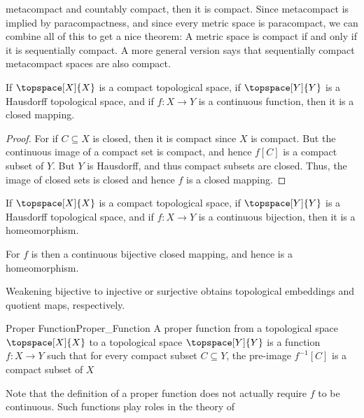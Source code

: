 \documentclass{article}                                                        %
\begin{document}
        metacompact and countably compact, then it is compact. Since metacompact
        is implied by paracompactness, and since every metric space is
        paracompact, we can combine all of this to get a nice theorem: A metric
        space is compact if and only if it is sequentially compact. A more
        general version says that sequentially compact metacompact spaces are
        also compact.
        \begin{theorem}
            If $\topspace[X]{X}$ is a compact topological space, if
            $\topspace[Y]{Y}$ is a Hausdorff topological space, and if
            $f:X\rightarrow{Y}$ is a continuous function, then it is a closed
            mapping.
        \end{theorem}
        \begin{proof}
            For if $C\subseteq{X}$ is closed, then it is compact since $X$ is
            compact. But the continuous image of a compact set is compact, and
            hence $f[C]$ is a compact subset of $Y$. But $Y$ is Hausdorff, and
            thus compact subsets are closed. Thus, the image of closed sets is
            closed and hence $f$ is a closed mapping.
        \end{proof}
        \begin{theorem}
            If $\topspace[X]{X}$ is a compact topological space, if
            $\topspace[Y]{Y}$ is a Hausdorff topological space, and if
            $f:X\rightarrow{Y}$ is a continuous bijection, then it is a
            homeomorphism.
        \end{theorem}
        \begin{theorem}
            For $f$ is then a continuous bijective closed mapping, and hence
            is a homeomorphism.
        \end{theorem}
        Weakening bijective to injective or surjective obtains topological
        embeddings and quotient maps, respectively.
        \begin{fdefinition}{Proper Function}{Proper_Function}
            A proper function from a topological space $\topspace[X]{X}$ to a
            topological space $\topspace[Y]{Y}$ is a function
            $f:X\rightarrow{Y}$ such that for every compact subset
            $C\subseteq{Y}$, the pre-image $f^{\minus{1}}[C]$ is a compact
            subset of $X$
        \end{fdefinition}
        Note that the definition of a proper function does not actually require
        $f$ to be continuous. Such functions play roles in the theory of
\end{document}
